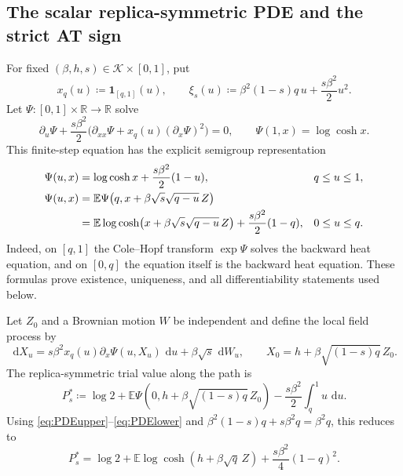 \documentclass[11pt]{article}
\numberwithin{equation}{section}
\newcommand{\E}{\mathbb{E}}
\newcommand{\1}{\mathbf 1}
\newcommand{\cK}{\mathcal K}
\newcommand{\dd}{\,\mathrm d}
\begin{document}
\subsection{The scalar replica-symmetric PDE and the strict AT sign}\label{subsec:ATsign}

For fixed $(\beta,h,s)\in\cK\times[0,1]$, put
\begin{equation}
 x_q(u)\coloneqq\1_{[q,1]}(u),\qquad
 \xi_s(u)\coloneqq\beta^2(1-s)q\,u+\frac{s\beta^2}{2}u^2.
 \label{eq:xqxi}
\end{equation}
Let $\Psi:[0,1]\times\mathbb R\to\mathbb R$ solve
\begin{equation}
 \partial_u\Psi+\frac{s\beta^2}{2}
 \bigl(\partial_{xx}\Psi+x_q(u)(\partial_x\Psi)^2\bigr)=0,
 \qquad \Psi(1,x)=\log\cosh x.
 \label{eq:parisipde}
\end{equation}
This finite-step equation has the explicit semigroup representation
\begin{align}
 \Psi(u,x)
 &=\log\cosh x+\frac{s\beta^2}{2}(1-u), &&q\le u\le1,
 \label{eq:PDEupper}\\
 \Psi(u,x)
 &=\E\Psi\bigl(q,x+\beta\sqrt{s}\sqrt{q-u}\,Z\bigr)\notag\\
 &=\E\log\cosh\bigl(x+\beta\sqrt{s}\sqrt{q-u}\,Z\bigr)
   +\frac{s\beta^2}{2}(1-q), &&0\le u\le q.
 \label{eq:PDElower}
\end{align}
Indeed, on $[q,1]$ the Cole--Hopf transform $\exp\Psi$ solves the
backward heat equation, and on $[0,q]$ the equation itself is the
backward heat equation.  These formulas prove existence, uniqueness,
and all differentiability statements used below.

Let $Z_0$ and a Brownian motion $W$ be independent and define the local
field process by
\begin{equation}
 \dd X_u=s\beta^2x_q(u)\partial_x\Psi(u,X_u)\,\dd u
 +\beta\sqrt{s}\,\dd W_u,
 \qquad X_0=h+\beta\sqrt{(1-s)q}\,Z_0.
 \label{eq:localfield}
\end{equation}
The replica-symmetric trial value along the path is
\begin{equation}
 P_s^*\coloneqq\log2+
 \E\Psi(0,h+\beta\sqrt{(1-s)q}\,Z_0)
 -\frac{s\beta^2}{2}\int_q^1u\,\dd u.
 \label{eq:scalartrial}
\end{equation}
Using \eqref{eq:PDEupper}--\eqref{eq:PDElower} and
$\beta^2(1-s)q+s\beta^2q=\beta^2q$, this reduces to
\begin{equation}
 P_s^*=\log2+\E\log\cosh(h+\beta\sqrt q\,Z)
 +\frac{s\beta^2}{4}(1-q)^2.
 \label{eq:RSpathvalue}
\end{equation}
\end{document}
